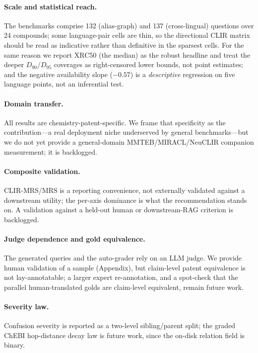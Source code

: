 \documentclass[11pt]{article}
\begin{document}
\paragraph{Scale and statistical reach.}
The benchmarks comprise 132 (alias-graph) and 137 (cross-lingual) questions over
24 compounds; some language-pair cells are thin, so the directional CLIR matrix
should be read as indicative rather than definitive in the sparsest cells. For
the same reason we report XRC50 (the median) as the robust headline and treat
the deeper $D_{90}/D_{95}$ coverages as right-censored lower bounds, not point
estimates; and the negative availability slope ($-0.57$) is a \emph{descriptive}
regression on five language points, not an inferential test.

\paragraph{Domain transfer.}
All results are chemistry-patent-specific. We frame that specificity as the
contribution---a real deployment niche underserved by general benchmarks---but
we do not yet provide a general-domain MMTEB/MIRACL/NeuCLIR companion
measurement; it is backlogged.

\paragraph{Composite validation.}
CLIR-MRS/MRS is a reporting convenience, not externally validated against a
downstream utility; the per-axis dominance is what the recommendation stands on.
A validation against a held-out human or downstream-RAG criterion is backlogged.

\paragraph{Judge dependence and gold equivalence.}
The generated queries and the auto-grader rely on an LLM judge. We provide human
validation of a sample (Appendix), but claim-level patent equivalence is not
lay-annotatable; a larger expert re-annotation, and a spot-check that the
parallel human-translated golds are claim-level equivalent, remain future work.

\paragraph{Severity law.}
Confusion severity is reported as a two-level sibling/parent split; the graded
ChEBI hop-distance decay law is future work, since the on-disk relation field is
binary.
\end{document}
